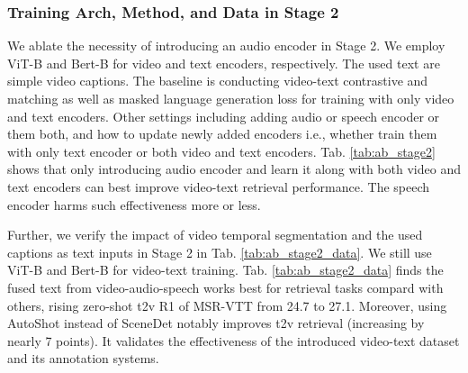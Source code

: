 \begin{table}[t]
\vspace{-0mm}
\caption{Zero-shot t2v retrieval on MSR-VTT with different training captions. 
}
\centering
\small
{}
\label{tab:ab_stage2_data}
\end{table}

\subsubsection{Training Arch, Method, and Data in Stage 2} We ablate the necessity of introducing an audio encoder in Stage 2. We employ ViT-B and Bert-B for video and text encoders, respectively. The used text are simple video captions. The baseline is conducting video-text contrastive and matching as well as masked language generation loss for training with only video and text encoders. Other settings including adding audio or speech encoder or them both, and how to update newly added encoders i.e., whether train them with only text encoder or both video and text encoders. Tab. \ref{tab:ab_stage2} shows that only introducing audio encoder and learn it along with both video and text encoders can best improve video-text retrieval performance. The speech encoder harms such effectiveness more or less.

Further, we verify the impact of video temporal segmentation and the used captions as text inputs in Stage 2 in Tab. \ref{tab:ab_stage2_data}. 
We still use ViT-B and Bert-B for video-text training. 
Tab. \ref{tab:ab_stage2_data} finds the fused text from video-audio-speech works best for retrieval tasks compard with others, rising zero-shot t2v R\@1 of MSR-VTT from 24.7 to 27.1. Moreover, using AutoShot instead of SceneDet notably improves t2v retrieval (increasing by nearly 7 points). It validates the effectiveness of the introduced video-text dataset and its annotation systems.

